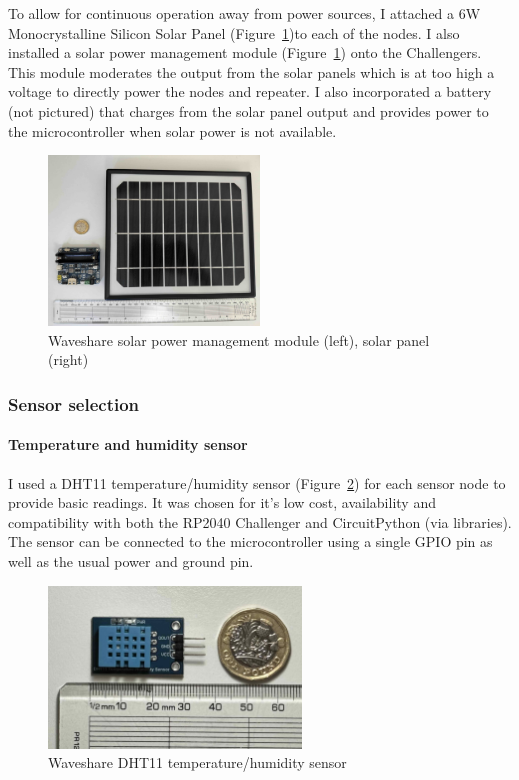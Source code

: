 To allow for continuous operation away from power sources, I attached a 6W
Monocrystalline Silicon Solar Panel (Figure~\ref{fig:solar-module})to each of
the nodes. I also installed a solar power management module
(Figure~\ref{fig:solar-module}) onto the Challengers. This module moderates the
output from the solar panels which is at too high a voltage to directly power
the nodes and repeater. I also incorporated a battery (not pictured) that
charges from the solar panel output and provides power to the microcontroller
when solar power is not available.

\begin{figure}[H]
    \centering
    \includegraphics[width=0.5\textwidth]{contents/part-2/fig2/solar-panel-manager.jpg}
    \caption{Waveshare solar power management module (left), solar panel (right)}
    \label{fig:solar-module}
\end{figure}

\subsubsection{Sensor selection} \label{sec:sensor-selection}

\paragraph{Temperature and humidity sensor}

I used a DHT11 temperature/humidity sensor (Figure~\ref{fig:dht11}) for each
sensor node to provide basic readings. It was chosen for it's low cost,
availability and compatibility with both the RP2040 Challenger and CircuitPython
(via libraries). The sensor can be connected to the microcontroller using a
single GPIO pin as well as the usual power and ground pin.

\begin{figure}[H]
    \centering
    \includegraphics[width=0.6\textwidth]{contents/part-2/fig2/dht11.jpg}
    \caption{Waveshare DHT11 temperature/humidity sensor}
    \label{fig:dht11}
\end{figure}

